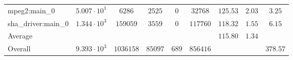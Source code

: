 \begin{tabular}{|l|c|c|c|c|c|c|c|c|}
mpeg2:main\_0           & $ 5.007 \cdot 10^{1} $ & $ 6286    $ & $ 2525  $ & $ 0   $ & $ 32768  $ & $ 125.53      $ & $ 2.03    $ & $ 3.25    $ \\
sha\_driver:main\_0     & $ 1.344 \cdot 10^{3} $ & $ 159059  $ & $ 3559  $ & $ 0   $ & $ 117760 $ & $ 118.32      $ & $ 1.55    $ & $ 6.15    $ \\
\hline
Average                 & $                    $ & $         $ & $       $ & $     $ & $        $ & $ 115.80      $ & $ 1.34    $ & $         $ \\
\hline
Overall                 & $ 9.393 \cdot 10^{3} $ & $ 1036158 $ & $ 85097 $ & $ 689 $ & $ 856416 $ & $             $ & $         $ & $ 378.57  $ \\
\hline
\end{tabular}
